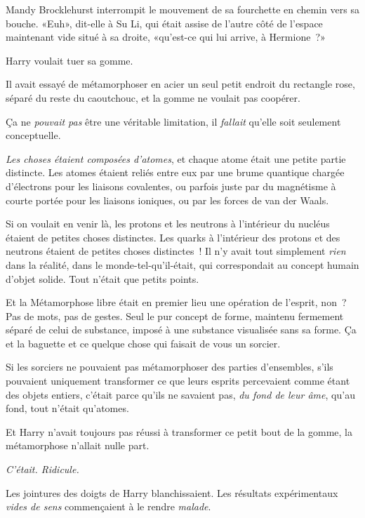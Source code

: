 \later

Mandy Brocklehurst interrompit le mouvement de sa fourchette en chemin vers sa bouche. «Euh», dit-elle à Su Li, qui était assise de l'autre côté de l'espace maintenant vide situé à sa droite, «qu'est-ce qui lui arrive, à Hermione~?»

\later

Harry voulait tuer sa gomme.

Il avait essayé de métamorphoser en acier un seul petit endroit du rectangle rose, séparé du reste du caoutchouc, et la gomme ne voulait pas coopérer.

Ça ne \emph{pouvait pas} être une véritable limitation, il \emph{fallait} qu'elle soit seulement conceptuelle.

\emph{Les choses étaient composées d'atomes}, et chaque atome était une petite partie distincte. Les atomes étaient reliés entre eux par une brume quantique chargée d'électrons pour les liaisons covalentes, ou parfois juste par du magnétisme à courte portée pour les liaisons ioniques, ou par les forces de van der Waals.

Si on voulait en venir là, les protons et les neutrons à l'intérieur du nucléus étaient de petites choses distinctes. Les quarks à l'intérieur des protons et des neutrons étaient de petites choses distinctes~! Il n'y avait tout simplement \emph{rien} dans la réalité, dans le monde-tel-qu'il-était, qui correspondait au concept humain d'objet solide. Tout n'était que petits points.

Et la Métamorphose libre était en premier lieu une opération de l'esprit, non~? Pas de mots, pas de gestes. Seul le pur concept de forme, maintenu fermement séparé de celui de substance, imposé à une substance visualisée sans sa forme. Ça et la baguette et ce quelque chose qui faisait de vous un sorcier.

Si les sorciers ne pouvaient pas métamorphoser des parties d'ensembles, s'ils pouvaient uniquement transformer ce que leurs esprits percevaient comme étant des objets entiers, c'était parce qu'ils ne savaient pas, \emph{du fond de leur âme}, qu'au fond, tout n'était qu'atomes.

Et Harry n'avait toujours pas réussi à transformer ce petit bout de la gomme, la métamorphose n'allait nulle part.

\emph{C'était. Ridicule.}

Les jointures des doigts de Harry blanchissaient. Les résultats expérimentaux \emph{vides de sens} commençaient à le rendre \emph{malade}.

